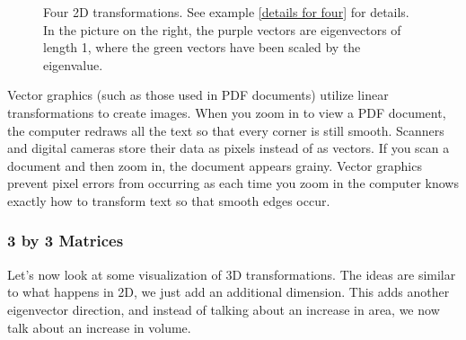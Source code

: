 \begin{example}
\begin{figure}
\begin{tikzpicture}
\end{tikzpicture}
\caption{Four 2D transformations. See example \ref{details for four} for details. In the picture on the right, the purple vectors are eigenvectors of length 1, where the green vectors have been scaled by the eigenvalue.
}
\label{four matrix transformations}
\end{figure}
\end{example}

 Vector graphics (such as those used in PDF documents) utilize linear transformations to create images.  
When you zoom in to view a PDF document, the computer redraws all the text so that every corner is still smooth.  
Scanners and digital cameras store their data as pixels instead of as vectors. 
If you scan a document and then zoom in, the document appears grainy.  
Vector graphics prevent pixel errors from occurring as each time you zoom in the computer knows exactly how to transform text so that smooth edges occur. 


\subsubsection{3 by 3 Matrices}

Let's now look at some visualization of 3D transformations. The ideas are similar to what happens in 2D, we just add an additional dimension. This adds another eigenvector direction, and instead of talking about an increase in area, we now talk about an increase in volume. 

